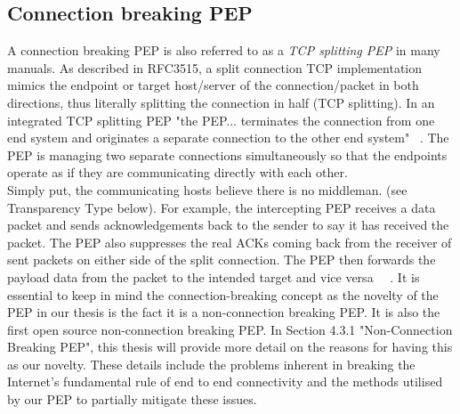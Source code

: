 \subsection{Connection breaking PEP}
A connection breaking PEP is also referred to as a \emph{TCP splitting PEP} in many manuals. As described in RFC3515, a split connection TCP implementation mimics the endpoint or target host/server of the connection/packet in both directions, thus literally splitting the connection in half (TCP splitting). In an integrated TCP splitting PEP "the PEP... terminates the connection from one end system and originates a separate connection to the other end system" ~\cite{6}. The PEP is managing two separate connections simultaneously so that the endpoints operate as if they are communicating directly with each other. \\

Simply put, the communicating hosts believe there is no middleman. (see Transparency Type below). For example, the intercepting PEP receives a data packet and sends acknowledgements back to the sender to say it has received the packet. The PEP also suppresses the real ACKs coming back from the receiver of sent packets on either side of the split connection. The PEP then forwards the payload data from the packet to the intended target and vice versa ~\cite{6}~\cite{14}. It is essential to keep in mind the connection-breaking concept as the novelty of the PEP in our thesis is the fact it is a non-connection breaking PEP. It is also the first open source non-connection breaking PEP. In Section 4.3.1 "Non-Connection Breaking PEP", this thesis will provide more detail on the reasons for having this as our novelty. These details include the problems inherent in breaking the Internet's fundamental rule of end to end connectivity and the methods utilised by our PEP to partially mitigate these issues. \\

